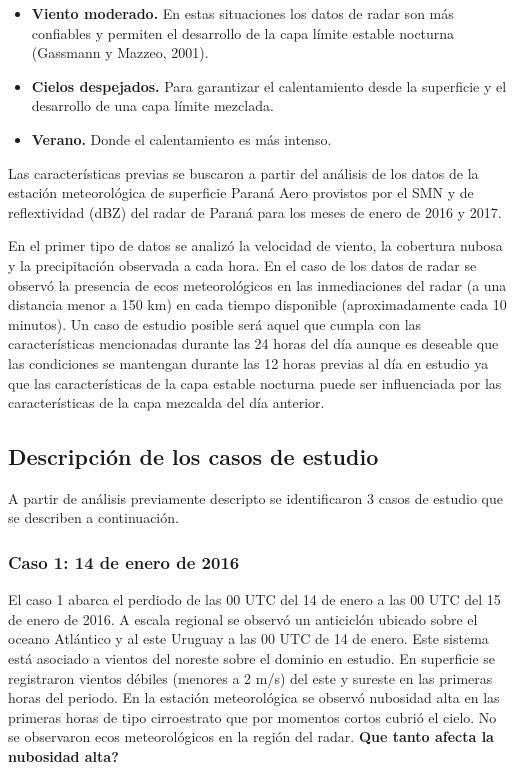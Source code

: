 \documentclass[12pt,spanish,oneside]{book}
\providecommand{\tightlist}{%
  \setlength{\itemsep}{0pt}\setlength{\parskip}{0pt}}
\begin{document}
\begin{itemize}
\tightlist
\item
  \textbf{Viento moderado.} En estas situaciones los datos de radar son
  más confiables y permiten el desarrollo de la capa límite estable
  nocturna (Gassmann y Mazzeo, 2001).
\item
  \textbf{Cielos despejados.} Para garantizar el calentamiento desde la
  superficie y el desarrollo de una capa límite mezclada.
\item
  \textbf{Verano.} Donde el calentamiento es más intenso.
\end{itemize}

Las características previas se buscaron a partir del análisis de los
datos de la estación meteorológica de superficie Paraná Aero provistos
por el SMN y de reflextividad (dBZ) del radar de Paraná para los meses
de enero de 2016 y 2017.

En el primer tipo de datos se analizó la velocidad de viento, la
cobertura nubosa y la precipitación observada a cada hora. En el caso de
los datos de radar se observó la presencia de ecos meteorológicos en las
inmediaciones del radar (a una distancia menor a 150 km) en cada tiempo
disponible (aproximadamente cada 10 minutos). Un caso de estudio posible
será aquel que cumpla con las características mencionadas durante las 24
horas del día aunque es deseable que las condiciones se mantengan
durante las 12 horas previas al día en estudio ya que las
características de la capa estable nocturna puede ser influenciada por
las características de la capa mezcalda del día anterior.

\subsection{Descripción de los casos de
estudio}\label{descripcion-de-los-casos-de-estudio}

A partir de análisis previamente descripto se identificaron 3 casos de
estudio que se describen a continuación.

\subsubsection{Caso 1: 14 de enero de
2016}\label{caso-1-14-de-enero-de-2016}

El caso 1 abarca el perdiodo de las 00 UTC del 14 de enero a las 00 UTC
del 15 de enero de 2016. A escala regional se observó un anticiclón
ubicado sobre el oceano Atlántico y al este Uruguay a las 00 UTC de 14
de enero. Este sistema está asociado a vientos del noreste sobre el
dominio en estudio. En superficie se registraron vientos débiles
(menores a 2 m/s) del este y sureste en las primeras horas del periodo.
En la estación meteorológica se observó nubosidad alta en las primeras
horas de tipo cirroestrato que por momentos cortos cubrió el cielo. No
se observaron ecos meteorológicos en la región del radar. \textbf{Que
tanto afecta la nubosidad alta?}
\end{document}
